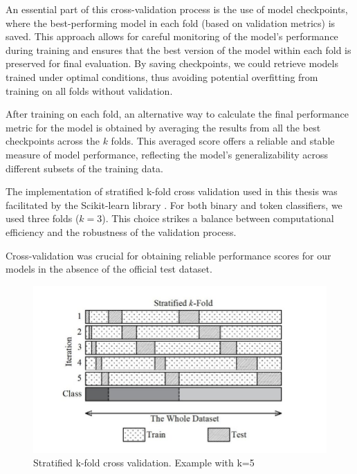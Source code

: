 \documentclass{Configuration_Files/PoliMi3i_thesis}
\begin{document}
An essential part of this cross-validation process is the use of model checkpoints, where the best-performing model in each fold (based on validation metrics) is saved. This approach allows for careful monitoring of the model's performance during training and ensures that the best version of the model within each fold is preserved for final evaluation. By saving checkpoints, we could retrieve models trained under optimal conditions, thus avoiding potential overfitting from training on all folds without validation.

After training on each fold, an alternative way to calculate the final performance metric for the model is obtained by averaging the results from all the best checkpoints across the $k$ folds. This averaged score offers a reliable and stable measure of model performance, reflecting the model’s generalizability across different subsets of the training data.

The implementation of stratified k-fold cross validation used in this thesis was facilitated by the Scikit-learn library \cite{pedregosa2011scikit}. For both binary and token classifiers, we used three folds ($k=3$). This choice strikes a balance between computational efficiency and the robustness of the validation process.

Cross-validation was crucial for obtaining reliable performance scores for our models in the absence of the official test dataset.

\begin{figure}[h]
 \centering
 \includegraphics[width=0.87\linewidth, height=0.36\textheight]{./Images/strat_cross_val}
 \caption{Stratified k-fold cross validation. Example with k=5 \cite{stratified_cross_val}}
 \label{fig:Strat_K_fold_cross_val}
\end{figure}
\FloatBarrier
\end{document}
